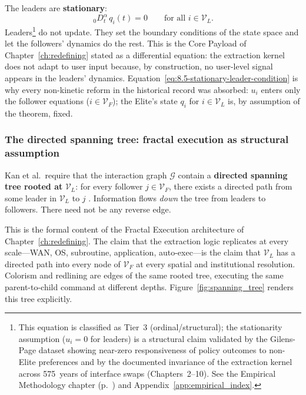 The leaders are \textbf{stationary}:
\begin{equation}
{}_{\,0}D_t^{\alpha}\, q_i(t) = 0 \qquad \text{for all } i \in \mathcal{V}_L. \label{eq:8.5-stationary-leader-condition}
\end{equation}
Leaders\footnote{This equation is classified as Tier~3 (ordinal/structural); the stationarity assumption ($u_i = 0$ for leaders) is a structural claim validated by the Gilens-Page dataset showing near-zero responsiveness of policy outcomes to non-Elite preferences \cite{gilens} and by the documented invariance of the extraction kernel across 575~years of interface swaps (Chapters~2--10). See the Empirical Methodology chapter (p.~\pageref{ch:empirical_methodology}) and Appendix~\ref{app:empirical_index}.} do not update. They set the boundary conditions of the state space and let the followers' dynamics do the rest. This is the Core Payload of Chapter~\ref{ch:redefining} stated as a differential equation: the extraction kernel does not adapt to user input because, by construction, no user-level signal appears in the leaders' dynamics. Equation~\ref{eq:8.5-stationary-leader-condition} is why every non-kinetic reform in the historical record was absorbed: $u_i$ enters only the follower equations ($i \in \mathcal{V}_F$); the Elite's state $q_i$ for $i \in \mathcal{V}_L$ is, by assumption of the theorem, fixed.

\subsubsection*{The directed spanning tree: fractal execution as structural assumption}

Kan et al.\ require that the interaction graph $\mathcal{G}$ contain a \textbf{directed spanning tree rooted at} $\mathcal{V}_L$: for every follower $j \in \mathcal{V}_F$, there exists a directed path from some leader in $\mathcal{V}_L$ to $j$ \cite{kan_containment}. Information flows \textit{down} the tree from leaders to followers. There need not be any reverse edge.

This is the formal content of the Fractal Execution architecture of Chapter~\ref{ch:redefining}. The claim that the extraction logic replicates at every scale---WAN, OS, subroutine, application, auto-exec---is the claim that $\mathcal{V}_L$ has a directed path into every node of $\mathcal{V}_F$ at every spatial and institutional resolution. Colorism and redlining are edges of the same rooted tree, executing the same parent-to-child command at different depths. Figure~\ref{fig:spanning_tree} renders this tree explicitly.

